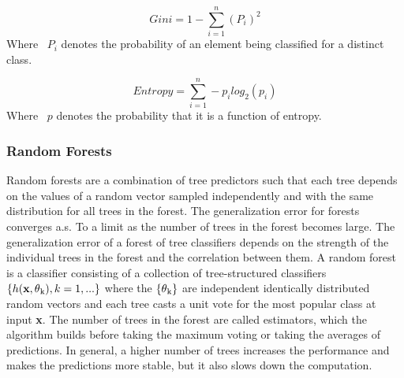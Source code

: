 \begin{equation}
Gini = 1 - \sum_{i=1}^{n} (P_{i})^{2}
\label{eq:gini}
\end{equation}
Where ~$P_{i}$ denotes the probability of an element being classified for a distinct class.

\begin{equation}
Entropy = \sum_{i=1}^{n} -p_{i} log_{2}(p_{i})
\label{eq:entropy}
\end{equation}
Where ~$p$ denotes the probability that it is a function of entropy.


\subsubsection{Random Forests}
\label{subsub:random_forests}
Random forests are a combination of tree predictors such that each tree depends on the values of a random vector sampled independently and with the same distribution for all trees in the forest\cite{Breiman2001}. The generalization error for forests converges a.s. To a limit as the number of trees in the forest becomes large. The generalization error of a forest of tree classifiers depends on the strength of the individual trees in the forest and the correlation between them.
A random forest is a classifier consisting of a collection of tree-structured
classifiers \(\{h(\textbf{x}, \theta \textsubscript{k} ), k = 1,...\}\) where the \( \{ \theta \textsubscript{k} \}\) are independent identically distributed
random vectors and each tree casts a unit vote for the most popular class at input \textbf{x}\cite{Breiman2001}.
The number of trees in the forest are called estimators, which the algorithm builds before taking the maximum voting or taking the averages of predictions. In general, a higher number of trees increases the performance and makes the predictions more stable, but it also slows down the computation.

